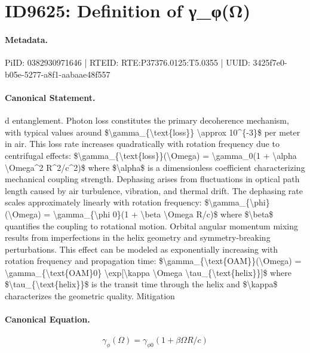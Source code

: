 \section*{ID9625: Definition of γ\_φ(Ω)}
\paragraph{Metadata.}
PiID: 0382930971646 | RTEID: RTE:P37376.0125:T5.0355 | UUID: 3425f7e0-b05e-5277-a8f1-aabaae48f557

\paragraph{Canonical Statement.}
d entanglement. Photon loss constitutes the primary decoherence mechanism, with typical values around \$\textbackslash{}gamma\_\{\textbackslash{}text\{loss\}\} \textbackslash{}approx 10\textasciicircum{}\{-3\}\$ per meter in air. This loss rate increases quadratically with rotation frequency due to centrifugal effects: \$\textbackslash{}gamma\_\{\textbackslash{}text\{loss\}\}(\textbackslash{}Omega) = \textbackslash{}gamma\_0(1 + \textbackslash{}alpha \textbackslash{}Omega\textasciicircum{}2 R\textasciicircum{}2/c\textasciicircum{}2)\$ where \$\textbackslash{}alpha\$ is a dimensionless coefficient characterizing mechanical coupling strength. Dephasing arises from fluctuations in optical path length caused by air turbulence, vibration, and thermal drift. The dephasing rate scales approximately linearly with rotation frequency: \$\textbackslash{}gamma\_\{\textbackslash{}phi\}(\textbackslash{}Omega) = \textbackslash{}gamma\_\{\textbackslash{}phi 0\}(1 + \textbackslash{}beta \textbackslash{}Omega R/c)\$ where \$\textbackslash{}beta\$ quantifies the coupling to rotational motion. Orbital angular momentum mixing results from imperfections in the helix geometry and symmetry-breaking perturbations. This effect can be modeled as exponentially increasing with rotation frequency and propagation time: \$\textbackslash{}gamma\_\{\textbackslash{}text\{OAM\}\}(\textbackslash{}Omega) = \textbackslash{}gamma\_\{\textbackslash{}text\{OAM\}0\} \textbackslash{}exp[\textbackslash{}kappa \textbackslash{}Omega \textbackslash{}tau\_\{\textbackslash{}text\{helix\}\}]\$ where \$\textbackslash{}tau\_\{\textbackslash{}text\{helix\}\}\$ is the transit time through the helix and \$\textbackslash{}kappa\$ characterizes the geometric quality. Mitigation

\paragraph{Canonical Equation.}
\[
\gamma_{\phi}(\Omega) = \gamma_{\phi 0}(1 + \beta \Omega R/c)
\]

